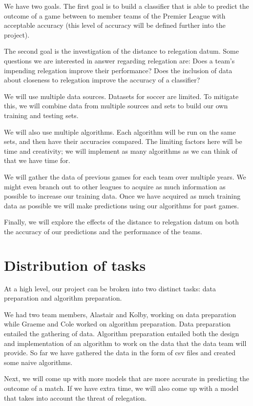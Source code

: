 \documentclass[conference]{IEEEtran}
\begin{document}
We have two goals. The first goal is to build a classifier that is  able to predict the outcome of a game between to member teams of the Premier League with acceptable accuracy (this level of accuracy will be defined further into the project).

The second goal is the investigation of the distance to relegation datum. Some questions we are interested in answer regarding relegation are:
Does a team’s impending relegation improve their performance?
Does the inclusion of data about closeness to relegation improve the accuracy of a classifier?

We will use multiple data sources. Datasets for soccer are limited. To mitigate this, we will combine data from multiple sources and sets to build our own training and testing sets.

We will also use multiple algorithms. Each algorithm will be run on the same sets, and then have their accuracies compared.  The limiting factors here will be time and creativity; we will implement as many algorithms as we can think of that we have time for.

We will gather the data of previous games for each team over multiple years. We might even branch out to other leagues to acquire as much information as possible to increase our training data. Once we have acquired as much training data as possible we will make predictions using our algorithms for past games.

Finally, we will explore the effects of the distance to relegation datum on both the accuracy of our predictions and the performance of the teams.

\section{Distribution of tasks}
At a high level, our project can be broken into two distinct tasks: data preparation and algorithm preparation.

We had two team members, Alastair and Kolby, working on data preparation while Graeme and Cole worked on algorithm preparation.
Data preparation entailed the gathering of data. Algorithm preparation entailed both the design and implementation of an algorithm to work on the data that the data team will provide.
So far we have gathered the data in the form of csv files and created some naive algorithms.

Next, we will come up with more models that are more accurate in predicting the outcome of a match. If we have extra time, we will also come up with a model that takes into account the threat of relegation. 
\end{document}

